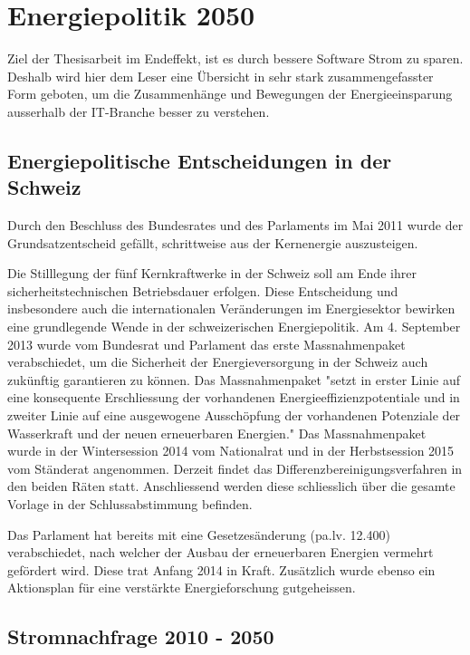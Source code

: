 \chapter{Energiepolitik 2050}

Ziel der Thesisarbeit im Endeffekt, ist es durch bessere Software Strom zu sparen. Deshalb wird hier dem Leser eine Übersicht in sehr stark zusammengefasster Form geboten, um die Zusammenhänge und Bewegungen der Energieeinsparung ausserhalb der IT-Branche besser zu verstehen.

\section{Energiepolitische Entscheidungen in der Schweiz\cite{bfe_energiestrategie}}
Durch den Beschluss des Bundesrates und des Parlaments im Mai 2011 wurde der Grundsatzentscheid gefällt,
schrittweise aus der Kernenergie auszusteigen. 
\par
Die Stilllegung der fünf Kernkraftwerke in der Schweiz soll am Ende ihrer sicherheitstechnischen
Betriebsdauer erfolgen. Diese Entscheidung und insbesondere auch die internationalen Veränderungen 
im Energiesektor bewirken eine grundlegende Wende in der schweizerischen Energiepolitik.
Am 4. September 2013 wurde vom Bundesrat und Parlament das erste Massnahmenpaket verabschiedet, um
die Sicherheit der Energieversorgung in der Schweiz auch zukünftig garantieren zu können. Das Massnahmenpaket "setzt in erster
Linie auf eine konsequente Erschliessung der vorhandenen Energieeffizienzpotentiale und in zweiter Linie auf eine ausgewogene Ausschöpfung der vorhandenen Potenziale der Wasserkraft und der neuen erneuerbaren Energien." Das Massnahmenpaket wurde in der Wintersession 2014 vom Nationalrat und in der Herbstsession 2015 vom Ständerat
angenommen. Derzeit findet das Differenzbereinigungsverfahren in den beiden Räten statt. Anschliessend werden diese schliesslich über die gesamte Vorlage in der Schlussabstimmung befinden. 
\par
Das Parlament hat bereits mit eine Gesetzesänderung (pa.lv. 12.400) verabschiedet, nach welcher der Ausbau der erneuerbaren Energien vermehrt gefördert wird. Diese trat Anfang 2014 in Kraft. Zusätzlich wurde ebenso ein Aktionsplan für eine verstärkte Energieforschung gutgeheissen.

\section{Stromnachfrage 2010 - 2050\cite{eth_energiezukunft_schweiz}}

